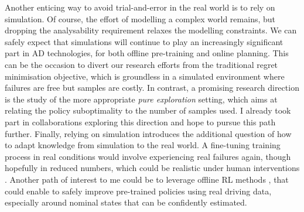Another enticing way to avoid trial-and-error in the real world is to rely on simulation. Of course, the effort of modelling a complex world remains, but dropping the analysability requirement relaxes the modelling constraints. We can safely expect that simulations will continue to play an increasingly significant part in \gls{AD} technologies, for both offline pre-training and online planning. This can be the occasion to divert our research efforts from the traditional regret minimisation objective, which is groundless in a simulated environment where failures are free but samples are costly. In contrast, a promising research direction is the study of the more appropriate \emph{pure exploration} setting, which aims at relating the policy suboptimality to the number of samples used. I already took part in collaborations exploring this direction \citep{Jonsson2020planning,Kaufmann2020adaptive,Menard2020Fast} and hope to pursue this path further. 
Finally, relying on simulation introduces the additional question of how to adapt knowledge from simulation to the real world. A fine-tuning training process in real conditions would involve experiencing real failures again, though hopefully in reduced numbers, which could be realistic under human interventions \citep{Saunders2018,Kendall2019}. Another path of interest to me could be to leverage offline \gls{RL} methods \citep{Thomas2015,Laroche2019}, that could enable to safely improve pre-trained policies using real driving data, especially around nominal states that can be confidently estimated.
